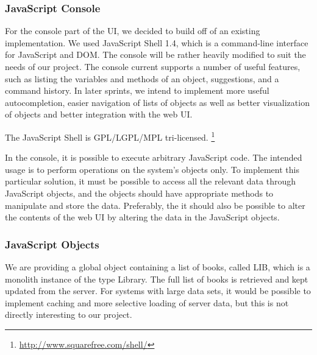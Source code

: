 \subsubsection{JavaScript Console}
For the console part of the UI, we decided to build off of an existing implementation. We used JavaScript Shell 1.4, which is a command-line interface for JavaScript and DOM. The console will be rather heavily modified to suit the needs of our project. The console current supports a number of useful features, such as listing the variables and methods of an object, suggestions, and a command history. In later sprints, we intend to implement more useful autocompletion, easier navigation of lists of objects as well as better visualization of objects and better integration with the web UI.

The JavaScript Shell is GPL/LGPL/MPL tri-licensed. 
\footnote{\url{http://www.squarefree.com/shell/}}

In the console, it is possible to execute arbitrary JavaScript code. The intended usage is to perform operations on the system's objects only. To implement this particular solution, it must be possible to access all the relevant data through JavaScript objects, and the objects should have appropriate methods to manipulate and store the data. Preferably, the it should also be possible to alter the contents of the web UI by altering the data in the JavaScript objects.

\subsubsection{JavaScript Objects}
We are providing a global object containing a list of books, called LIB, which is a monolith instance of the type Library. The full list of books is retrieved and kept updated from the server. For systems with large data sets, it would be possible to implement caching and more selective loading of server data, but this is not directly interesting to our project. 

